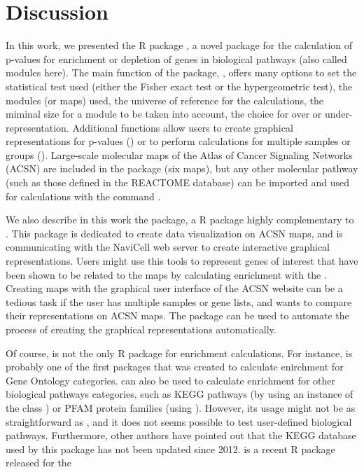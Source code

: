 \documentclass[article]{jss}
\begin{document}
\section[Discussion]{Discussion}
In this work, we presented the R package , a novel package for
the calculation of p-values for enrichment or depletion of genes in biological
pathways (also called modules here). The main function of the package,
, offers many options to set the statistical test used (either
the Fisher exact test or the hypergeometric test), the modules (or maps) used,
the universe of reference for the calculations, the miminal size for a module to
be taken into account, the choice for over or under-representation. Additional
functions allow users to create graphical representations for p-values
() or to perform calculations for multiple samples
or groups (). Large-scale molecular maps of the
Atlas of Cancer Signaling Networks (ACSN) are included in the package (six
maps), but any other molecular pathway (such as those defined in the REACTOME
database) can be imported and used for calculations with the command
. 

We also describe in this work the  package, a R package highly
complementary to . This package is dedicated to create data
visualization on ACSN maps, and is communicating with the NaviCell web server to
create interactive graphical representations. Users might use this tools to
represent genes of interest that have been shown to be related to the maps by
calculating enrichment with the  .  Creating maps with the
graphical user interface of the ACSN website can be a tedious task if the user
has multiple samples or gene lists, and wants to compare their representations
on ACSN maps. The  package can be used to automate the process of
creating the graphical representations automatically. 

Of course,  is not the only R package for enrichment calculations. For
instance,  \citep{falcon2007using} is probably one of the first
packages that was created to calculate enirchment for Gene Ontology categories.
 can also be used to calculate enrichment for other biological
pathways categories, such as KEGG pathways (by using an instance of the class
) or PFAM protein families (using
). However, its usage might not be as straightforward as
, and it does not seems possible to test user-defined biological
pathways. Furthermore, other authors have pointed out that the KEGG database
used by this package has not been updated since 2012.  is a
recent R package released for the  
\end{document}
